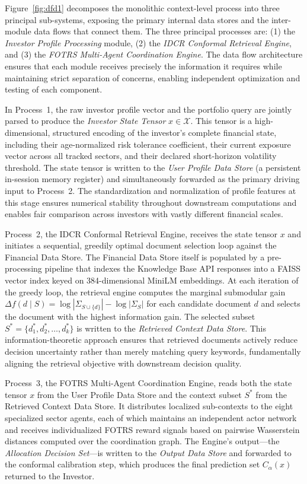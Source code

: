 \documentclass[12pt,a4paper,oneside]{report}
\theoremstyle{definition}
\theoremstyle{remark}
\begin{document}
Figure~\ref{fig:dfd1} decomposes the monolithic context-level process into three principal sub-systems, exposing the primary internal data stores and the inter-module data flows that connect them. The three principal processes are: (1) the \emph{Investor Profile Processing} module, (2) the \emph{IDCR Conformal Retrieval Engine}, and (3) the \emph{FOTRS Multi-Agent Coordination Engine}. The data flow architecture ensures that each module receives precisely the information it requires while maintaining strict separation of concerns, enabling independent optimization and testing of each component.

In Process~1, the raw investor profile vector and the portfolio query are jointly parsed to produce the \emph{Investor State Tensor} $x \in \mathcal{X}$. This tensor is a high-dimensional, structured encoding of the investor's complete financial state, including their age-normalized risk tolerance coefficient, their current exposure vector across all tracked sectors, and their declared short-horizon volatility threshold. The state tensor is written to the \emph{User Profile Data Store} (a persistent in-session memory register) and simultaneously forwarded as the primary driving input to Process~2. The standardization and normalization of profile features at this stage ensures numerical stability throughout downstream computations and enables fair comparison across investors with vastly different financial scales.

Process~2, the IDCR Conformal Retrieval Engine, receives the state tensor $x$ and initiates a sequential, greedily optimal document selection loop against the Financial Data Store. The Financial Data Store itself is populated by a pre-processing pipeline that indexes the Knowledge Base API responses into a FAISS vector index keyed on 384-dimensional MiniLM embeddings. At each iteration of the greedy loop, the retrieval engine computes the marginal submodular gain $\Delta f(d \mid S) = \log|\Sigma_{S \cup \{d\}}| - \log|\Sigma_S|$ for each candidate document $d$ and selects the document with the highest information gain. The selected subset $S^* = \{d_1^*, d_2^*, \ldots, d_k^*\}$ is written to the \emph{Retrieved Context Data Store}. This information-theoretic approach ensures that retrieved documents actively reduce decision uncertainty rather than merely matching query keywords, fundamentally aligning the retrieval objective with downstream decision quality.

Process~3, the FOTRS Multi-Agent Coordination Engine, reads both the state tensor $x$ from the User Profile Data Store and the context subset $S^*$ from the Retrieved Context Data Store. It distributes localized sub-contexts to the eight specialized sector agents, each of which maintains an independent actor network and receives individualized FOTRS reward signals based on pairwise Wasserstein distances computed over the coordination graph. The Engine's output---the \emph{Allocation Decision Set}---is written to the \emph{Output Data Store} and forwarded to the conformal calibration step, which produces the final prediction set $C_\alpha(x)$ returned to the Investor.
\end{document}
